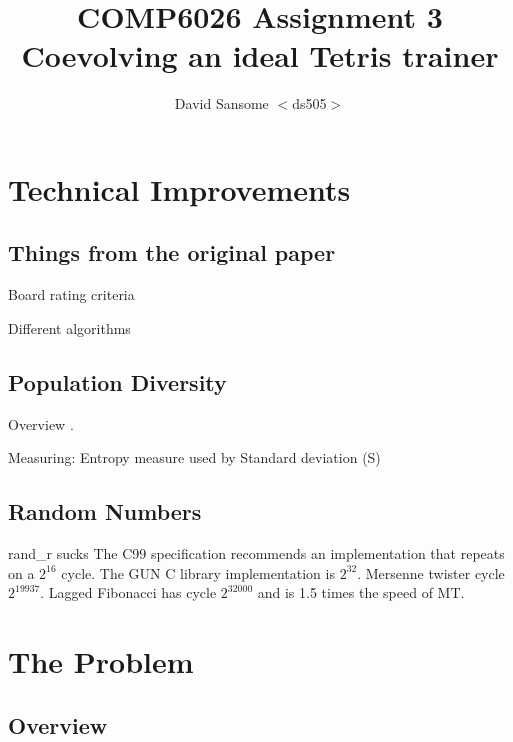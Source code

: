 \documentclass[a4paper,11pt]{article}
\title{COMP6026 Assignment 3 \\
Coevolving an ideal Tetris trainer}
\author{David Sansome $<$ds505$>$}
\begin{document}


\maketitle

\begin{abstract}



\end{abstract}

\clearpage
\tableofcontents

\section{Technical Improvements}

\subsection{Things from the original paper}

Board rating criteria \cite{Mandl2005}

Different algorithms

\subsection{Population Diversity}

Overview \cite{nsakanda2007ensuring}.

Measuring:
Entropy measure \cite{grefenstette1987incorporating} used by \cite{gupta1995minimizing}
Standard deviation (S)

\subsection{Random Numbers}

rand\_r sucks
The C99 specification \cite{C99} recommends an implementation that repeats on a $2^16$ cycle.
The GUN C library implementation is $2^32$.
Mersenne twister \cite{matsumoto1998mersenne} cycle $2^19937$.
Lagged Fibonacci \cite{brent1992uniform} has cycle $2^32000$ and is 1.5 times
the speed of MT.

\section{The Problem}

\subsection{Overview}
\end{document}
